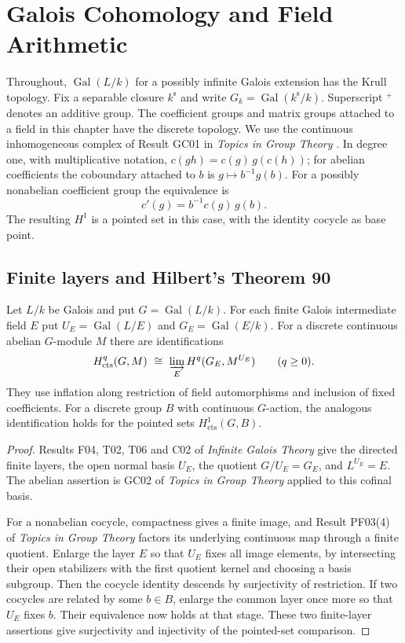 \chapter{Galois Cohomology and Field Arithmetic}
\label{ch:galois-cohomology}

Throughout, \(\operatorname{Gal}(L/k)\) for a possibly infinite Galois
extension has the Krull topology. Fix a separable closure \(k^{\mathrm s}\)
and write \(G_k=\operatorname{Gal}(k^{\mathrm s}/k)\). Superscript
\({}^{+}\) denotes an additive group. The coefficient groups and matrix
groups attached to a field in this chapter have the discrete topology.
We use the continuous inhomogeneous complex of Result GC01 in
\emph{Topics in Group Theory} \cite[PDF p.~24]{mg-groups}. In degree one,
with multiplicative notation, \(c(gh)=c(g)\,g(c(h))\); for abelian
coefficients the coboundary attached to \(b\) is \(g\mapsto b^{-1}g(b)\).
For a possibly nonabelian coefficient group the equivalence is
\[
 c'(g)=b^{-1}c(g)\,g(b).
\]
The resulting \(H^1\) is a pointed set in this case, with the identity
cocycle as base point.

\section{Finite layers and Hilbert's Theorem 90}

\begin{proposition}
\label{res:GH01}
Let \(L/k\) be Galois and put \(G=\operatorname{Gal}(L/k)\).
For each finite Galois intermediate field \(E\) put
\(U_E=\operatorname{Gal}(L/E)\) and
\(G_E=\operatorname{Gal}(E/k)\). For a discrete continuous abelian
\(G\)-module \(M\) there are identifications
\[
 H^q_{\mathrm{cts}}(G,M)
   \ \cong\ \varinjlim_E H^q(G_E,M^{U_E})\qquad(q\geq 0).
\]
They use inflation along restriction of field automorphisms and inclusion
of fixed coefficients. For a discrete group \(B\) with continuous
\(G\)-action, the analogous identification holds for the pointed sets
\(H^1_{\mathrm{cts}}(G,B)\).
\end{proposition}
\begin{proof}
Results F04, T02, T06 and C02 of \emph{Infinite Galois Theory}
\cite[PDF pp.~5, 9--10, 12]{mg-aft} give the directed finite layers,
the open normal basis \(U_E\), the quotient \(G/U_E=G_E\), and
\(L^{U_E}=E\). The abelian assertion is GC02 of \emph{Topics in Group
Theory} \cite[PDF p.~24]{mg-groups} applied to this cofinal basis.

For a nonabelian cocycle, compactness gives a finite image, and
Result PF03(4) of \emph{Topics in Group Theory}
\cite[PDF p.~16]{mg-groups} factors its underlying continuous map
through a finite quotient. Enlarge the layer \(E\) so that \(U_E\)
fixes all image elements, by intersecting their open stabilizers
with the first quotient kernel and choosing a basis subgroup.
Then the cocycle identity descends by surjectivity of restriction.
If two cocycles are related by some \(b\in B\), enlarge the common
layer once more so that \(U_E\) fixes \(b\). Their equivalence now
holds at that stage. These two finite-layer assertions give
surjectivity and injectivity of the pointed-set comparison.
\end{proof}


